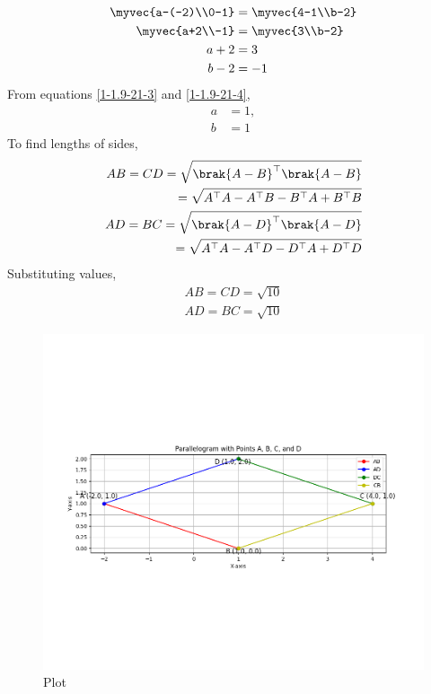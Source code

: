 \documentclass[journal]{IEEEtran}
\begin{document}
 \begin{align}
\myvec{a-(-2)\\0-1}&=\myvec{4-1\\b-2}\label{1-1.9-21-1}\\
\myvec{a+2\\-1}&=\myvec{3\\b-2}\label{1-1.9-21-2}\\
a+2&=3\label{1-1.9-21-3}\\
b-2&=-1\label{1-1.9-21-4}
\end{align}
 From equations \eqref{1-1.9-21-3} and \eqref{1-1.9-21-4}, 
\begin{align}
a&=1,\\
b&=1
\end{align}
To find lengths of sides,
\begin{align}
AB=CD=\sqrt{\brak{A-B}^\top\brak{A-B}}\\
=\sqrt{A^\top A-A^\top B -B^\top A+B^\top B }\label{1-1.9-21-5}\\
AD=BC=\sqrt{\brak{A-D}^\top\brak{A-D}}\\
=\sqrt{A^\top A-A^\top D -D^\top A+D^\top D }\label{1-1.9-21-6}\\
\end{align}
Substituting values,
\begin{align}
AB=CD=\sqrt{10}\label{1-1.9-21-7}\\
AD=BC=\sqrt{10}\label{1-1.9-21-8}
\end{align}
\begin{figure}[h!]
   \centering
   \includegraphics[width=1.1\linewidth]{Figs/Figure1.png}
   \caption{Plot}
   \label{1-1.9-21-fig-1}
\end{figure}
\end{document}
